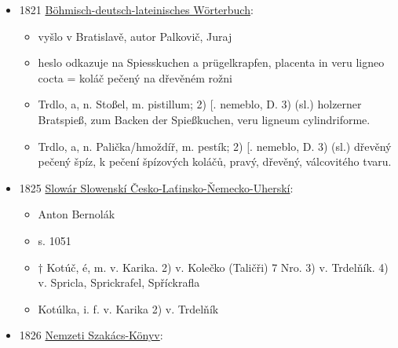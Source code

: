 \begin{itemize}
  \begin{itemize}
  \tightlist
  \item
    jen slovníkový heslo: Spießkuchen, m. wagečnjk, sl. trdelnjk,
    obelia.
  \item
    další
    \href{https://bara.ujc.cas.cz/slovniky/dobrovsky/dobrovsky195.html}{heslo}:

    \begin{itemize}
    \tightlist
    \item
      Eyerkuchen, m. Eyerfladen, Eyerplatz, ſwjtek z wagec.
    \end{itemize}
  \end{itemize}
\item
  1821
  \href{https://ndk.cz/view/uuid:46b33740-ac9f-11dc-bcf0-000d606f5dc6?page=uuid\%3A52eb1c50-0ecb-11e8-bdb0-005056827e51&fulltext=trdelnjk}{Böhmisch-deutsch-lateinisches
  Wörterbuch}:

  \begin{itemize}
  \tightlist
  \item
    vyšlo v Bratislavě, autor Palkovič, Juraj
  \item
    heslo odkazuje na Spiesskuchen a prügelkrapfen, placenta in veru
    ligneo cocta = koláč pečený na dřevěném rožni
  \item
    Trdlo, a, n. Stoßel, m. pistillum; 2) {[}. nemeblo, D. 3) (sl.)
    holzerner Bratspieß, zum Backen der Spießkuchen, veru ligneum
    cylindriforme.
  \item
    Trdlo, a, n. Palička/hmoždíř, m. pestík; 2) {[}. nemeblo, D. 3)
    (sl.) dřevěný pečený špíz, k pečení špízových koláčů, pravý,
    dřevěný, válcovitého tvaru.
  \end{itemize}
\item
  1825
  \href{https://www.google.cz/books/edition/Slow\%C3\%A1r_Slowensk\%C3\%AD_\%C4\%8Cesko_La\%C5\%A5insko_\%C5\%87em/Sd1bAAAAcAAJ?hl=cs&gbpv=1&dq=trdeln\%C3\%ADk&pg=PA1051&printsec=frontcover}{Slowár
  Slowenskí Česko-Laťinsko-Ňemecko-Uherskí}:

  \begin{itemize}
  \tightlist
  \item
    Anton Bernolák
  \item
    s. 1051
  \item
    † Kotúč, é, m. v. Karika. 2) v. Kolečko (Taličři) 7 Nro. 3) v.
    Trdelňík. 4) v. Spricla, Sprickrafel, Spříckrafla
  \item
    Kotúlka, i. f. v. Karika 2) v. Trdelňík
  \end{itemize}
\item
  1826
  \href{https://web.archive.org/web/20201229075645/http://www.kurtos.eu/dl/nemzeti_szakacskonyv.pdf}{Nemzeti
  Szakács-Könyv}:


\end{itemize}
